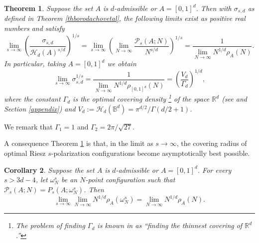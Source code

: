 \documentclass[12pt]{amsart}
\newtheorem{theorem}{Theorem}[section]
\newtheorem{corollary}[theorem]{Corollary}
\theoremstyle{definition}
\newtheorem{defin}[theorem]{Definition}
\def\R{\mathbb{R}}
\newcommand{\1}{\mathbf{1}}
\newcommand{\PP}{\mathcal{P}}
\def\H{\mathcal{H}}
\begin{document}
\begin{theorem}\label{bestcovering}
Suppose the set $A$ is $d$-admissible or $A=[0,1]^d$.
Then with $\sigma_{s,d}$ as defined in Theorem \ref{thborodachovetal}, the following limits exist as positive real numbers and satisfy	
\begin{equation}\label{princess}
\lim_{s\to \infty} \left(\frac{\sigma_{s,d}}{\H_d(A)^{s/d}}\right)^{1/s}=\lim_{s\to \infty} \left(\lim_{N\to \infty}\frac{\PP_s(A; N)}{N^{s/d}}\right)^{1/s} = \frac{1}{\lim_{N\to \infty} N^{1/d}\rho_A(N)}.
\end{equation}
In particular, taking $A=[0,1]^d$ we obtain
\begin{equation}
\lim_{s\to \infty} \sigma_{s,d}^{1/s} = \frac{1}{\lim_{N\to\infty} N^{1/d}\rho_{[0,1]^d}(N)} = \left(\frac{V_d}{\Gamma_d}\right)^{1/d},
\end{equation}
where the constant $\Gamma_d$ is the optimal covering density \footnote{The problem of finding $\Gamma_d$ is known in \cite{ConwSlBook} as ``finding the thinnest covering of $\R^d$.''} of the space $\R^d$ (see \cite[Chapter 2]{ConwSlBook} and Section \ref{appendix}) and $V_d:=\H_d(\mathbb{B}^d)=\pi^{d/2}/\Gamma(d/2+1)$.
\end{theorem}
We remark that $\Gamma_1=1$ and $\Gamma_2=2\pi/\sqrt{27}$.

A consequence Theorem \ref{bestcovering} is that, in the limit as $s\to \infty$, the covering radius of optimal Riesz $s$-polarization configurations become asymptotically best possible.
\begin{corollary}
Suppose the set $A$ is $d$-admissible or $A=[0,1]^d$. For every $s>3d-4$, let $\omega_N^s$ be an $N$-point configuration such that $\PP_s(A; N)=P_s(A; \omega_N^s)$. Then
$$
\lim_{s\to\infty}\lim_{N\to\infty}N^{1/d}\rho_A(\omega_N^s) = \lim_{N\to \infty}N^{1/d}\rho_A(N).
$$
\end{corollary}

\bigskip
\end{document}

